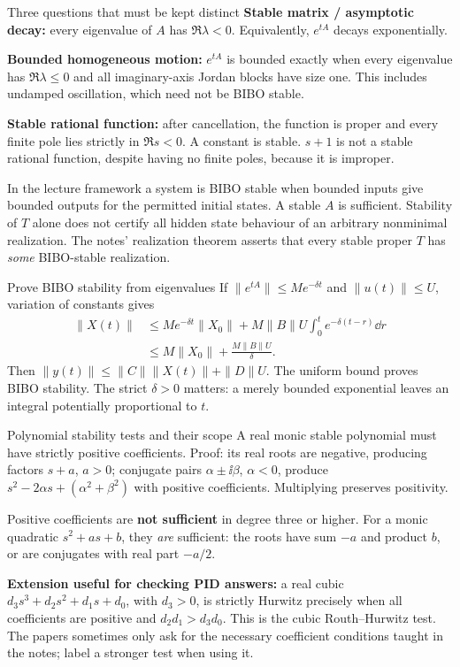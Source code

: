 \begin{concept}{Three questions that must be kept distinct}
\textbf{Stable matrix / asymptotic decay:} every eigenvalue of $A$ has $\Re\lambda<0$. Equivalently, $e^{tA}$ decays exponentially.

\textbf{Bounded homogeneous motion:} $e^{tA}$ is bounded exactly when every eigenvalue has $\Re\lambda\leq0$ and all imaginary-axis Jordan blocks have size one. This includes undamped oscillation, which need not be BIBO stable.

\textbf{Stable rational function:} after cancellation, the function is proper and every finite pole lies strictly in $\Re s<0$. A constant is stable. $s+1$ is not a stable rational function, despite having no finite poles, because it is improper.

In the lecture framework a system is BIBO stable when bounded inputs give bounded outputs for the permitted initial states. A stable $A$ is sufficient. Stability of $T$ alone does not certify all hidden state behaviour of an arbitrary nonminimal realization. The notes' realization theorem asserts that every stable proper $T$ has \emph{some} BIBO-stable realization.
\end{concept}
\begin{method}{Prove BIBO stability from eigenvalues}
If $\|e^{tA}\|\leq Me^{-\delta t}$ and $\|u(t)\|\leq U$, variation of constants gives
\begin{align*}
\|X(t)\|&\leq Me^{-\delta t}\|X_0\|+M\|B\|U\int_0^t e^{-\delta(t-r)}\dd r\\
&\leq M\|X_0\|+\frac{M\|B\|U}{\delta}.
\end{align*}
Then $\|y(t)\|\leq\|C\|\|X(t)\|+\|D\|U$. The uniform bound proves BIBO stability. The strict $\delta>0$ matters: a merely bounded exponential leaves an integral potentially proportional to $t$.
\end{method}
\begin{concept}{Polynomial stability tests and their scope}
A real monic stable polynomial must have strictly positive coefficients. Proof: its real roots are negative, producing factors $s+a$, $a>0$; conjugate pairs $\alpha\pm\ii\beta$, $\alpha<0$, produce $s^2-2\alpha s+(\alpha^2+\beta^2)$ with positive coefficients. Multiplying preserves positivity.

Positive coefficients are \textbf{not sufficient} in degree three or higher. For a monic quadratic $s^2+as+b$, they \emph{are} sufficient: the roots have sum $-a$ and product $b$, or are conjugates with real part $-a/2$.

\textbf{Extension useful for checking PID answers:} a real cubic $d_3s^3+d_2s^2+d_1s+d_0$, with $d_3>0$, is strictly Hurwitz precisely when all coefficients are positive and $d_2d_1>d_3d_0$. This is the cubic Routh--Hurwitz test. The papers sometimes only ask for the necessary coefficient conditions taught in the notes; label a stronger test when using it.
\end{concept}
